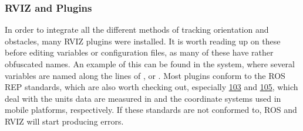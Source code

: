 \subsubsection{RVIZ and Plugins}
In order to integrate all the different methods of tracking orientation and obstacles, many RVIZ plugins were installed.
It is worth reading up on these before editing variables or configuration files, as many of these have rather obfuscated names.
An example of this can be found in the  system, where several variables are named along the lines of , or .
Most plugins conform to the ROS REP standards, which are also worth checking out, especially \href{https://www.ros.org/reps/rep-0103.html}{103}  and \href{https://www.ros.org/reps/rep-0105.html}{105}, which deal with the units data are measured in and the coordinate systems used in mobile platforms, respectively.
If these standards are not conformed to, ROS and RVIZ will start producing errors.

\newpage